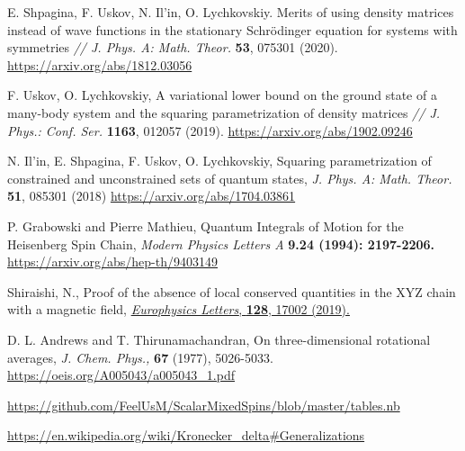 \documentclass[]{article}
\renewcommand{\[}{\begin{equation}}
\renewcommand{\]}{\end{equation}}
\begin{document}
\begin{thebibliography}{99}
	

	E. Shpagina, F. Uskov, N. Il’in, O. Lychkovskiy. Merits of using density matrices instead of wave
	functions in the stationary Schrödinger equation for systems with symmetries {\it// J. Phys. A: Math. Theor.}
	{\bf 53}, 075301 (2020).
	\href{https://arxiv.org/abs/1812.03056}{https://arxiv.org/abs/1812.03056}
	
	F. Uskov, O. Lychkovskiy, A variational lower bound on the ground state of a many-body system and
	the squaring parametrization of density matrices {\it// J. Phys.: Conf. Ser.} {\bf 1163}, 012057 (2019).
	\href{https://arxiv.org/abs/1902.09246}{https://arxiv.org/abs/1902.09246}

	 N. Il'in, E. Shpagina, F. Uskov, O. Lychkovskiy,
	Squaring parametrization of constrained and unconstrained sets of quantum states, {\it J. Phys. A: Math. Theor.} {\bf 51}, 085301 (2018)
	\href{https://arxiv.org/abs/1704.03861}{https://arxiv.org/abs/1704.03861}
	
	

	
	P. Grabowski and Pierre Mathieu, Quantum Integrals of Motion for the Heisenberg Spin Chain, {\it  Modern Physics Letters A} {\bf 9.24 (1994): 2197-2206.}
	\href{https://arxiv.org/abs/hep-th/9403149}{https://arxiv.org/abs/hep-th/9403149}

     Shiraishi, N., Proof of the absence of local conserved quantities in the XYZ chain with a magnetic field,  \href{https://doi.org/10.1209/0295-5075/128/17002}{
    {\it Europhysics Letters}, {\bf 128}, 17002 (2019).
    }
    
	D. L. Andrews and T. Thirunamachandran, On three-dimensional rotational averages, {\it J. Chem. Phys.,} {\bf 67} (1977), 5026-5033.
	\href{https://oeis.org/A005043/a005043_1.pdf}
	{https://oeis.org/A005043/a005043\_1.pdf}

	\href{https://github.com/FeelUsM/ScalarMixedSpins/blob/master/tables.nb}
	{https://github.com/FeelUsM/ScalarMixedSpins/blob/master/tables.nb}
	
	\href{https://en.wikipedia.org/wiki/Kronecker_delta#Generalizations}
	{https://en.wikipedia.org/wiki/Kronecker\_delta\#Generalizations}
	
\end{thebibliography}
\end{document}
